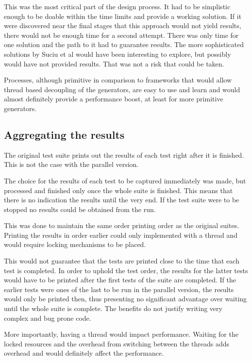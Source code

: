 This was the most critical part of the design process. It had to be simplistic enough to be doable within the time limits and provide a working solution. If it were discovered near the final stages that this approach would not yield results, there would not be enough time for a second attempt. There was only time for one solution and the path to it had to guarantee results. The more sophisticated solutions by Suciu et al\cite{parallelism-paper2} would have been interesting to explore, but possibly would have not provided results. That was not a risk that could be taken.

Processes, although primitive in comparison to frameworks that would allow thread based decoupling of the generators, are easy to use and learn and would almost definitely provide a performance boost, at least for more primitive generators.

\subsection{Aggregating the results}
The original test suite prints out the results of each test right after it is finished. This is not the case with the parallel version.

The choice for the results of each test to be captured immediately was made, but processed and finished only once the whole suite is finished. This means that there is no indication the results until the very end. If the test suite were to be stopped no results could be obtained from the run.

This was done to maintain the same order printing order as the original suites. Printing the results in order earlier could only implemented with a thread and would require locking mechanisms to be placed.

This would not guarantee that the tests are printed close to the time that each test is completed. In order to uphold the test order, the results for the latter tests would have to be printed after the first tests of the suite are completed. If the earlier tests were ones of the last to be run in the parallel version, the results would only be printed then, thus presenting no significant advantage over waiting until the whole suite is complete. The benefits do not justify writing very complex and bug prone code.

More importantly, having a thread would impact performance. Waiting for the locked resources and the overhead from switching between the threads adds overhead and would definitely affect the performance.

